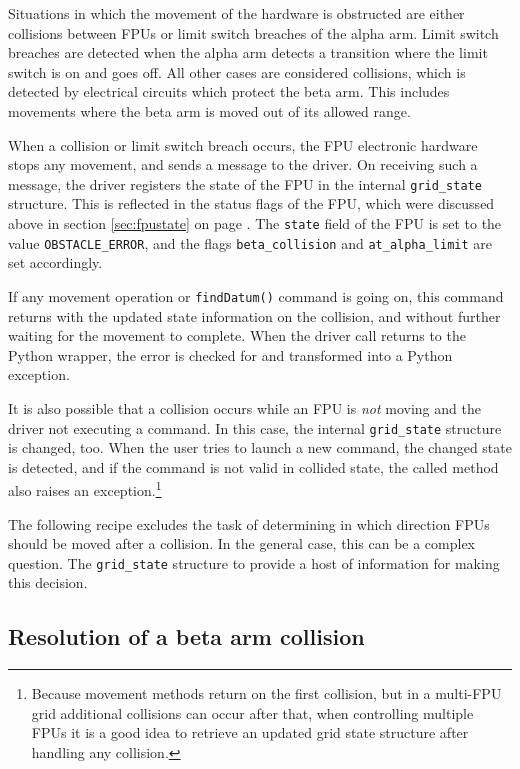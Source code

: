 \documentclass{scrartcl}[12pt,a4paper]
\begin{document}
Situations in which the movement of the hardware is obstructed
are either collisions between FPUs or limit switch breaches
of the alpha arm. Limit switch breaches are detected
when the alpha arm detects a transition where the
limit switch is on and goes off. All other cases are
considered collisions, which is detected by electrical
circuits which protect the beta arm. This includes
movements where the beta arm is moved out of its
allowed range.

When a collision or limit switch breach occurs, the FPU electronic
hardware stops any movement, and sends a message to the driver. On
receiving such a message, the driver registers the state of the FPU in
the internal \texttt{grid\_state} structure. This is reflected in the
status flags of the FPU, which were discussed above in section
\ref{sec:fpustate} on page \pageref{sec:fpustate}.  The \texttt{state}
field of the FPU is set to the value \texttt{OBSTACLE\_ERROR}, and the
flags \texttt{beta\_collision} and \texttt{at\_alpha\_limit} are set
accordingly.

If any movement operation or \texttt{findDatum()} command is going on,
this command returns with the updated state information on the
collision, and without further waiting for the movement to complete.
When the driver call returns to the Python wrapper, the error is
checked for and transformed into a Python exception.

It is also possible that a collision occurs while an FPU is \emph{not}
moving and the driver not executing a command.  In this case, the
internal \texttt{grid\_state} structure is changed, too. When the user
tries to launch a new command, the changed state is detected, and if
the command is not valid in collided state, the called method also
raises an exception.\footnote{Because movement methods return on the
  first collision, but in a multi-FPU grid additional collisions can
  occur after that, when controlling multiple FPUs it is a good idea
  to retrieve an updated grid state structure after handling any
  collision.}

The following recipe excludes the task of determining in which
direction FPUs should be moved after a collision.  In the general
case, this can be a complex question. The \texttt{grid\_state}
structure to provide a host of information for making this decision.

\subsection{Resolution of a beta arm collision}
\end{document}
